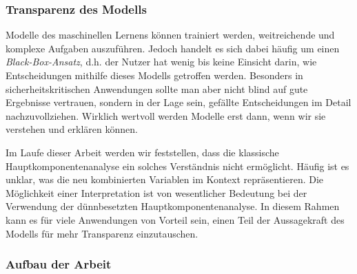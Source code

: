 

\subsubsection{Transparenz des Modells}

Modelle des maschinellen Lernens können trainiert werden, weitreichende und komplexe Aufgaben auszuführen. Jedoch handelt es sich dabei häufig um einen \textit{Black-Box-Ansatz}, d.h. der Nutzer hat wenig bis keine Einsicht darin, wie Entscheidungen mithilfe dieses Modells getroffen werden. Besonders in sicherheitskritischen Anwendungen sollte man aber nicht blind auf gute Ergebnisse vertrauen, sondern in der Lage sein, gefällte Entscheidungen im Detail nachzuvollziehen. Wirklich wertvoll werden Modelle erst dann, wenn wir sie verstehen und erklären können.

Im Laufe dieser Arbeit werden wir feststellen, dass die klassische Hauptkomponentenanalyse ein solches Verständnis nicht ermöglicht. Häufig ist es unklar, was die neu kombinierten Variablen im Kontext repräsentieren. Die Möglichkeit einer Interpretation ist von wesentlicher Bedeutung bei der Verwendung der dünnbesetzten Hauptkomponentenanalyse. In diesem Rahmen kann es für viele Anwendungen von Vorteil sein, einen Teil der Aussagekraft des Modells für mehr Transparenz einzutauschen.




\subsubsection{Aufbau der Arbeit}

